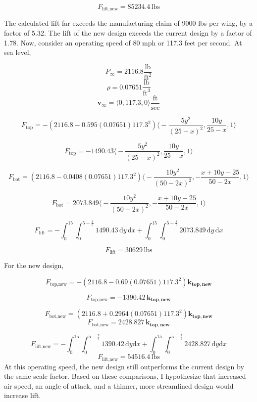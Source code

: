 \documentclass[12pt]{article}
\begin{document}
\[  F_{\text{lift,new}} = 85234.4 \, \text{lbs} \]

The calculated lift far exceeds the manufacturing claim of 9000 lbs per wing, by a factor of 5.32. The lift of the new design exceeds the current design by a factor of 1.78. Now, consider an operating speed of 80 mph or 117.3 feet per second. At sea level, 

\[ P_\infty = 2116.8 \frac{\text{lb}}{\text{ft}^2}\]
\[ \rho = 0.07651 \frac{\text{lb}}{\text{ft}^3}\]
\[ \mathbf{v}_\infty = \langle 0, 117.3, 0 \rangle \frac{\text{ft}}{\text{sec}}\]

\[F_\text{top} = -(2116.8 - 0.595(0.07651)117.3^2)\Bigg\langle -\frac{5y^2}{(25 - x)^2}, \frac{10y}{25 - x}, 1 \Bigg\rangle\]

\[F_\text{top} = -1490.43\Bigg\langle -\frac{5y^2}{(25 - x)^2}, \frac{10y}{25 - x}, 1 \Bigg\rangle\]

\[F_\text{bot} = (2116.8 - 0.0408(0.07651)117.3^2)\Bigg\langle -\frac{10y^2}{(50 - 2x)^2}, -\frac{x + 10y - 25}{50 - 2x}, 1 \Bigg\rangle \]

\[F_\text{bot} = 2073.849\Bigg\langle -\frac{10y^2}{(50 - 2x)^2}, -\frac{x + 10y - 25}{50 - 2x}, 1 \Bigg\rangle \]

\[F_\text{lift} = -\int_0^{15} \int_0^{5 - \frac{x}{5}} 1490.43 \, \mathrm{d}y \, \mathrm{d}x + \int_0^{15} \int_0^{5 - \frac{x}{5}} 2073.849 \, \mathrm{d}y \, \mathrm{d}x\]

\[ F_\text{lift} = 30629 \, \text{lbs}\]

For the new design, 

\[ F_{\text{top,new}} = -(2116.8 - 0.69(0.07651)117.3^2)\mathbf{k_{top,new}}\]

\[F_{\text{top,new}} = -1390.42 \, \mathbf{k_{top,new}} \]

\[ F_{\text{bot,new}} = (2116.8 + 0.2964(0.07651)117.3^2)\mathbf{k_{top,new}}  \]
\[ F_{\text{bot,new}} = 2428.827 \, \mathbf{k_{top,new}}\]



\[ F_{\text{lift,new}} = -\int_0^{15} \int_0^{5 - \frac{x}{5}} 1390.42 \, \mathrm{d}y \mathrm{d}x + \int_0^{15} \int_0^{5 - \frac{x}{5}} 2428.827 \,  \mathrm{d}y \mathrm{d}x \]
\[  F_{\text{lift,new}} = 54516.4 \, \text{lbs} \] 
At this operating speed, the new design still outperforms the current design by the same scale factor. Based on these comparisons, I hypothesize that increased air speed, an angle of attack, and a thinner, more streamlined design would increase lift.
\end{document}
